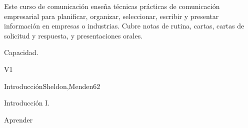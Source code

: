 
\begin{syllabus}


\begin{justification}
Este curso de comunicación enseña técnicas prácticas de comunicación empresarial para planificar, organizar, seleccionar, escribir y presentar información en empresas o industrias. Cubre notas de rutina, cartas, cartas de solicitud y respuesta, y presentaciones orales.
   \end{justification}
   
   \begin{goals}
   \item Capacidad.
   \end{goals}
   
   \begin{outcomes}{V1}
      \item {}
   \end{outcomes}
   
   \begin{unit}{Introducción}{}{Sheldon,Menden}{6}{2}
   \begin{topics}
         \item Introducción I.
      \end{topics}
   
      \begin{learningoutcomes}
         \item Aprender
      \end{learningoutcomes}
   \end{unit}
   
   
   
   
   
   
   \begin{coursebibliography}
   \end{coursebibliography}
   
   \end{syllabus}
   
